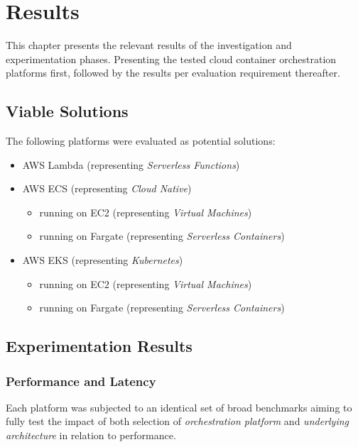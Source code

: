 \chapter{Results}
\label{sec:results}

This chapter presents the relevant results of the investigation and experimentation phases.
Presenting the tested cloud container orchestration platforms first,
followed by the results per evaluation requirement thereafter.

\section{Viable Solutions}
The following platforms were evaluated as potential solutions:
\begin{itemize}
  \item AWS Lambda (representing \textit{Serverless Functions})
  \item AWS ECS (representing \textit{Cloud Native})
        \begin{itemize}
          \item running on EC2 (representing \textit{Virtual Machines})
          \item running on Fargate (representing \textit{Serverless Containers})
        \end{itemize}
  \item AWS EKS (representing \textit{Kubernetes})
        \begin{itemize}
          \item running on EC2 (representing \textit{Virtual Machines})
          \item running on Fargate (representing \textit{Serverless Containers})
        \end{itemize}
\end{itemize}

\section{Experimentation Results}

\subsection{Performance and Latency}
Each platform was subjected to an identical set of broad benchmarks aiming to fully test the impact of both
selection of \emph{orchestration platform} and \emph{underlying architecture} in relation to performance.

